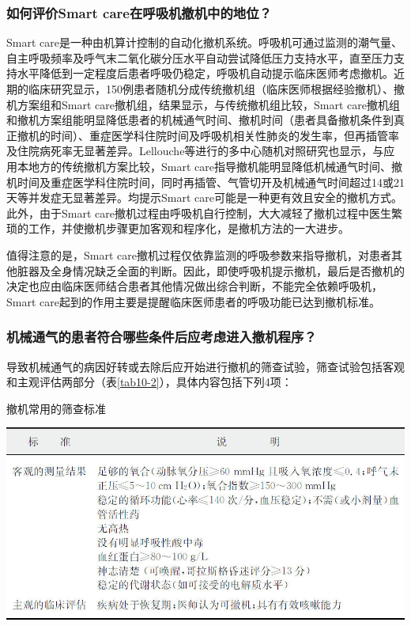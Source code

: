 \subsubsection{如何评价Smart care在呼吸机撤机中的地位？}

Smart
care是一种由机算计控制的自动化撤机系统。呼吸机可通过监测的潮气量、自主呼吸频率及呼气末二氧化碳分压水平自动尝试降低压力支持水平，直至压力支持水平降低到一定程度后患者呼吸仍稳定，呼吸机自动提示临床医师考虑撤机。近期的临床研究显示，150例患者随机分成传统撤机组（临床医师根据经验撤机）、撤机方案组和Smart
care撤机组，结果显示，与传统撤机组比较，Smart
care撤机组和撤机方案组能明显降低患者的机械通气时间、撤机时间（患者具备撤机条件到真正撤机的时间）、重症医学科住院时间及呼吸机相关性肺炎的发生率，但再插管率及住院病死率无显著差异。Lellouche等进行的多中心随机对照研究也显示，与应用本地方的传统撤机方案比较，Smart
care指导撤机能明显降低机械通气时间、撤机时间及重症医学科住院时间，同时再插管、气管切开及机械通气时间超过14或21天等并发症无显著差异。均提示Smart
care可能是一种更有效且安全的撤机方式。此外，由于Smart
care撤机过程由呼吸机自行控制，大大减轻了撤机过程中医生繁琐的工作，并使撤机步骤更加客观和程序化，是撤机方法的一大进步。

值得注意的是，Smart
care撤机过程仅依靠监测的呼吸参数来指导撤机，对患者其他脏器及全身情况缺乏全面的判断。因此，即使呼吸机提示撤机，最后是否撤机的决定也应由临床医师结合患者其他情况做出综合判断，不能完全依赖呼吸机，Smart
care起到的作用主要是提醒临床医师患者的呼吸功能已达到撤机标准。

\subsubsection{机械通气的患者符合哪些条件后应考虑进入撤机程序？}

导致机械通气的病因好转或去除后应开始进行撤机的筛查试验，筛查试验包括客观和主观评估两部分（表\ref{tab10-2}），具体内容包括下列4项：

\begin{table}[htbp]
\centering
\caption{撤机常用的筛查标准}
\label{tab10-2}
\includegraphics{./images/Image00084.jpg}
\end{table}

